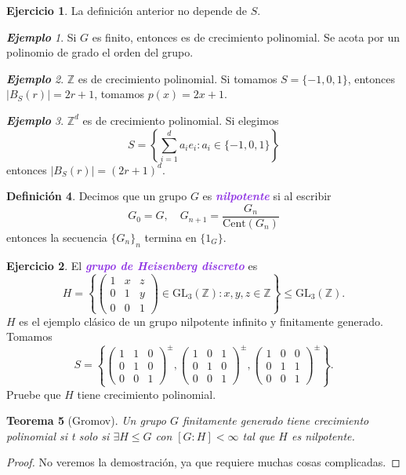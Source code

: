 \documentclass{article}
\newtheorem{theorem}{Teorema}[subsection]
\theoremstyle{definition}
\newtheorem{definition}[theorem]{Definición}
\newtheorem{exercise}{Ejercicio}
\theoremstyle{remark}
\newtheorem{example}[theorem]{\textbf{Ejemplo}}
\numberwithin{equation}{section}
\newcommand{\Z}{\mathbb{Z}}
\newcommand{\oo}{\infty}
\newcommand{\GL}{\mathrm{GL}}
\newcommand{\Cent}{\mathrm{Cent}}
\newcommand{\abs}[1]{\left| #1 \right|}
\newcommand{\set}[1]{\left\{ #1 \right\}}
\newcommand{\matr}[1]{\begin{pmatrix}#1\end{pmatrix}}
\newcommand{\wea}[1]{\textcolor{BlueViolet}{\textbf{\emph{#1}}}}
\begin{document}
\begin{exercise}
  La definición anterior no depende de $S$.
\end{exercise}

\begin{example}
  Si $G$ es finito, entonces es de crecimiento polinomial. Se acota por un polinomio de grado el orden del grupo.
\end{example}

\begin{example}
  $\Z$ es de crecimiento polinomial. Si tomamos $S = \{-1,0,1\}$, entonces $\abs{B_S(r)} = 2r + 1$, tomamos $p(x) = 2x+1$.
\end{example}

\begin{example}
  $\Z^d$ es de crecimiento polinomial. Si elegimos
  \[S = \set{\sum_{i=1}^d a_ie_i : a_i \in \{-1,0,1\}}\]
  entonces $\abs{B_S(r)} = (2r+1)^d.$
\end{example}

\begin{definition}
  Decimos que un grupo $G$ es \wea{nilpotente} si al escribir
  \[G_0 = G, \quad G_{n+1} = \frac{G_n}{\Cent(G_n)}\]
  entonces la secuencia $\{G_n\}_n$ termina en $\{1_G\}$.
\end{definition}

\begin{exercise}
  El \wea{grupo de Heisenberg discreto} es
  \[H = \set{\matr{1 & x & z \\ 0 & 1 & y \\ 0 & 0 & 1} \in \GL_3(\Z) : x,y,z \in \Z} \leqslant \GL_3(\Z).\]
  $H$ es el ejemplo clásico de un grupo nilpotente infinito y finitamente generado. Tomamos
  \[S = \set{\matr{1&1&0\\0&1&0\\0&0&1}^\pm, \matr{1&0&1\\0&1&0\\0&0&1}^\pm, \matr{1&0&0\\0&1&1\\0&0&1}^\pm}.\]
  Pruebe que $H$ tiene crecimiento polinomial.
\end{exercise}

\begin{theorem}
  [Gromov]
  Un grupo $G$ finitamente generado tiene crecimiento polinomial si t solo si $\exists H \leqslant G$ con $[G : H] < \oo$ tal que $H$ es nilpotente.
\end{theorem}
\begin{proof}
  No veremos la demostración, ya que requiere muchas cosas complicadas.
\end{proof}
\end{document}
